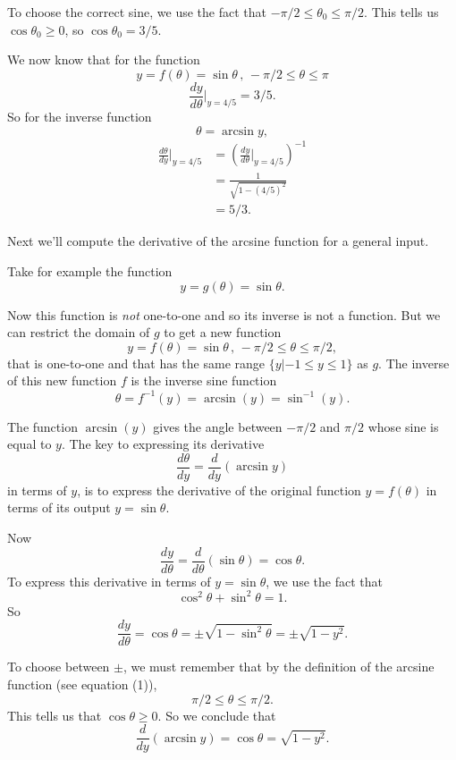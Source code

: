 \documentclass{ximera}
\begin{document}
\begin{example}
To choose the correct sine, we use the fact that $-\pi/2 \leq \theta_0 \leq \pi/2$. This tells us $\cos\theta_0 \geq 0$, so $\cos\theta_0 = 3/5$.

We now know that for the function
\[
  y = f(\theta) = \sin\theta \, , \, -\pi/2 \leq \theta \leq \pi
\]
\[
    \frac{dy}{d\theta}\Big|_{y=4/5} = 3/5.
\]
So for the inverse function
\[
     \theta = \arcsin y ,
\]
\begin{align*}
 \frac{d\theta}{dy}\Big|_{y=4/5} &= \left( \frac{dy}{d\theta}\Big|_{y=4/5} \right)^{-1} \\
                                                & =\frac{1}{\sqrt{1-(4/5)^2}}  \\
                                                & = 5/3 .
\end{align*}

\end{example}

Next we'll compute the derivative of the arcsine function for a general input.




\begin{example} \label{Ecbfghnbng}
Take for example the function
\[
     y = g(\theta) = \sin\theta.
\]

Now this function is \emph{not} one-to-one and so its inverse is not a function. But we can restrict the domain of $g$ to get a new function
\begin{equation}  
     y =f(\theta) = \sin\theta \, , \, -\pi/2 \leq \theta \leq \pi/2 , \label{Eq:ArcSine}
\end{equation}
that is one-to-one and that has the same range $\{y | -1 \leq y \leq 1\}$ as $g$. The inverse of this new function $f$ is the inverse sine function
\[
    \theta = f^{-1}(y) = \arcsin(y) = \sin^{-1}(y) .
\]

The function $\arcsin (y)$ gives the angle between $-\pi/2$ and $\pi/2$ whose sine is equal to $y$. The key to expressing its derivative
\[
  \frac{d\theta}{dy} = \frac{d}{dy}\left(  \arcsin y \right)
\]
in terms of $y$, is to express the derivative of the original function $y=f(\theta)$ in terms of its output $y=\sin\theta$.

Now
\[
     \frac{dy}{d\theta} = \frac{d}{d\theta} \left( \sin\theta \right) = \cos\theta .
\]
To express this derivative in terms of $y=\sin\theta$, we use the fact that 
\[
 \cos^2\theta + \sin^2\theta = 1 .
\]
So 
\[
      \frac{dy}{d\theta} = \cos\theta = \pm \sqrt{1-\sin^2\theta} = \pm \sqrt{1-y^2}.
\]

To choose between $\pm$, we must remember that by the definition of the arcsine function (see equation (1)), 
\[
   \pi/2 \leq \theta \leq \pi/2 .
\]
This tells us that $\cos\theta \geq 0$. So we conclude that
\[
\frac{d}{dy}\left(  \arcsin y \right)  =\cos\theta = \sqrt{1-y^2}.
\]
\end{example}
\end{document}
